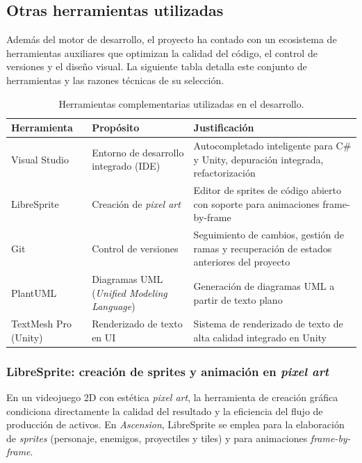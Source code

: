 \subsection{Otras herramientas utilizadas}


Además del motor de desarrollo, el proyecto ha contado con un ecosistema de herramientas auxiliares que optimizan la calidad del código, el control de versiones y el diseño visual. La siguiente tabla detalla este conjunto de herramientas y las razones técnicas de su selección.


\begin{table}[H]
\centering
{\small
\begin{tabular}{|p{}|p{}|p{}|}
\hline
\textbf{Herramienta} & \textbf{Propósito} & \textbf{Justificación} \\ \hline
Visual Studio & Entorno de desarrollo integrado (IDE) & Autocompletado inteligente para C\# y Unity, depuración integrada, refactorización \\ \hline
LibreSprite & Creación de \textit{pixel art} & Editor de sprites de código abierto con soporte para animaciones frame-by-frame \\ \hline
Git & Control de versiones & Seguimiento de cambios, gestión de ramas y recuperación de estados anteriores del proyecto \\ \hline
PlantUML & Diagramas UML (\textit{Unified Modeling Language}) & Generación de diagramas UML a partir de texto plano \\ \hline
TextMesh Pro (Unity) & Renderizado de texto en UI & Sistema de renderizado de texto de alta calidad integrado en Unity \\ \hline
\end{tabular}
}
\caption{Herramientas complementarias utilizadas en el desarrollo.}
\end{table}

\subsubsection{LibreSprite: creación de sprites y animación en \textit{pixel art}}


En un videojuego 2D con estética \textit{pixel art}, la herramienta de creación gráfica condiciona directamente la calidad del resultado y la eficiencia del flujo de producción de activos. En \textit{Ascension}, LibreSprite se emplea para la elaboración de \textit{sprites} (personaje, enemigos, proyectiles y tiles) y para animaciones \textit{frame-by-frame}.

